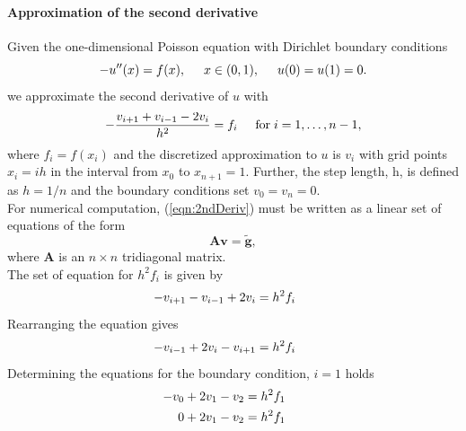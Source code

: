 \documentclass[%
oneside,                 %
final,                   %
10pt]{article}
\begin{document}
\paragraph{Approximation of the second derivative}
Given the one-dimensional Poisson equation with Dirichlet boundary conditions
\begin{equation*}
-u''(x) = f(x), \hspace{0.5cm} x\in(0,1), \hspace{0.5cm} u(0) = u(1) = 0.
\end{equation*}
we approximate the second derivative of $u$ with
\begin{equation}\label{eqn:2ndDeriv}
   -\frac{v_{i+1}+v_{i-1}-2v_i}{h^2} = f_i  \hspace{0.5cm} \mathrm{for} \hspace{0.1cm} i=1,\dots, n-1,
\end{equation}
where $f_i=f(x_i)$ and the discretized approximation to $u$ is $v_i$ with grid points $x_i = ih$ in the interval from $x_0$ to $x_{n+1}=1$.
Further, the step length, h,  is defined as $h=1/n$ and the boundary conditions set $v_0 = v_{n}=0$. \\
For numerical computation, (\ref{eqn:2ndDeriv}) must be written as a linear set of equations of the form
\begin{equation*}
   \mathbf{A}\mathbf{v} = \tilde{\mathbf{g}},
\end{equation*}
where $\mathbf{A}$ is an $n\times n$  tridiagonal matrix.\\
The set of equation for $h^2f_i$ is given by
\begin{equation*}
   -v_{i+1}-v_{i-1}+2v_i = h^2f_i  \hspace{0.5cm} 
\end{equation*}
Rearranging the equation gives
\begin{equation}
  -v_{i-1}+2v_i - v_{i+1}= h^2f_i  \hspace{0.5cm} 
\end{equation}
Determining the equations for the boundary condition, $i=1$ holds 
\begin{equation}
\begin{aligned}
  -v_{0}+2v_1 - v_{2}&= h^2f_1  \hspace{0.5cm} \\
  0 + 2v_1 - v_{2}&= h^2f_1  \hspace{0.5cm} 
\end{aligned}
\end{equation}
\end{document}
